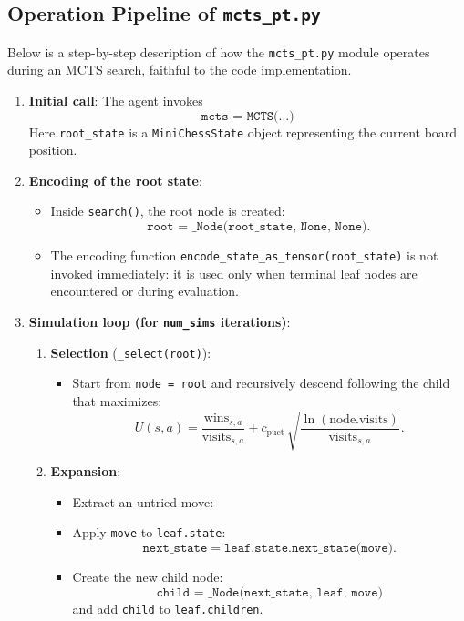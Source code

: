 \documentclass{report}
\begin{document}
\subsection{Operation Pipeline of \texttt{mcts\_pt.py}}
\label{sec:mcts_pipeline}
Below is a step-by-step description of how the \texttt{mcts\_pt.py} module operates during an MCTS search, faithful to the code implementation.

\begin{enumerate}
  \item \textbf{Initial call}: The agent invokes  
    \[
      \texttt{mcts = MCTS(...)}
    \]
    Here \texttt{root\_state} is a \texttt{MiniChessState} object representing the current board position.

  \item \textbf{Encoding of the root state}:
    \begin{itemize}
      \item Inside \texttt{search()}, the root node is created:  
        \[
          \texttt{root = \_Node(root\_state, None, None).}
        \]
      \item The encoding function \texttt{encode\_state\_as\_tensor(root\_state)} is not invoked immediately: it is used only when terminal leaf nodes are encountered or during evaluation.
    \end{itemize}

  \item \textbf{Simulation loop (for \texttt{num\_sims} iterations)}:
    \begin{enumerate}
      \item \textbf{Selection} (\texttt{\_select(root)}):
        \begin{itemize}
          \item Start from \texttt{node = root} and recursively descend following the child that maximizes:
            \[
              U(s,a) = \frac{\text{wins}_{s,a}}{\text{visits}_{s,a}} + c_{\text{puct}} \,\sqrt{\frac{\ln(\text{node.visits})}{\text{visits}_{s,a}}}.
            \]
        \end{itemize}

      \item \textbf{Expansion}:
        \begin{itemize}
          \item Extract an untried move:  
          \item Apply \texttt{move} to \texttt{leaf.state}:  
            \[
              \texttt{next\_state} = \texttt{leaf.state.next\_state(move)}.
            \]
          \item Create the new child node:  
            \[
              \texttt{child = \_Node(next\_state, leaf, move)} 
            \]  
            and add \texttt{child} to \texttt{leaf.children}.
        \end{itemize}


\end{enumerate}
\end{enumerate}
\end{document}
